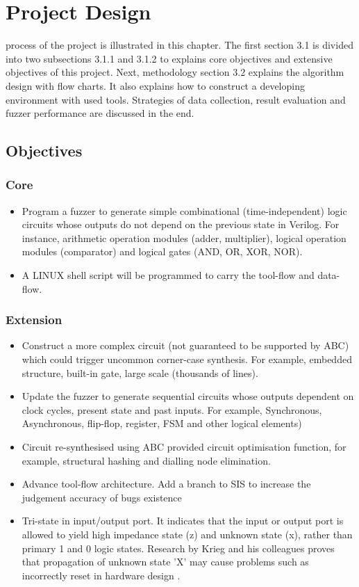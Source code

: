 \chapter{Project Design}
\renewcommand{\baselinestretch}{\mystretch}
\label{chap:ProDes}
 process of the project is illustrated in this chapter. The first section 3.1 is divided into two subsections 3.1.1 and 3.1.2 to explains core objectives and extensive objectives of this project. Next, methodology section 3.2 explains the algorithm design with flow charts. It also explains how to construct a developing environment with used tools. Strategies of data collection, result evaluation and fuzzer performance are discussed in the end.

\section{Objectives}
\subsection{Core}
\begin{itemize}
     \item Program a fuzzer to generate simple combinational (time-independent) logic circuits whose outputs do not depend on the previous state in Verilog. For instance, arithmetic operation modules (adder, multiplier), logical operation modules (comparator) and logical gates (AND, OR, XOR, NOR).
    \item A LINUX shell script will be programmed to carry the tool-flow and data-flow.
\end{itemize}


\subsection{Extension}
\begin{itemize}
    \item Construct a more complex circuit (not guaranteed to be supported by ABC) which could trigger uncommon corner-case synthesis. For example, embedded structure, built-in gate, large scale (thousands of lines).
    \item Update the fuzzer to generate sequential circuits whose outputs dependent on clock cycles, present state and past inputs. For example, Synchronous, Asynchronous, flip-flop, register, FSM and other logical elements)
    \item Circuit re-synthesised using ABC provided circuit optimisation function, for example, structural hashing and dialling node elimination.
    \item Advance tool-flow architecture. Add a branch to SIS\cite{SIS} to increase the judgement accuracy of bugs existence
    \item Tri-state in input/output port. It indicates that the input or output port is allowed to yield high impedance state (z) and unknown state (x), rather than primary 1 and 0 logic states. Research by Krieg and his colleagues proves that propagation of unknown state 'X' may cause problems such as incorrectly reset in hardware design \cite{x-prop}.
\end{itemize}

